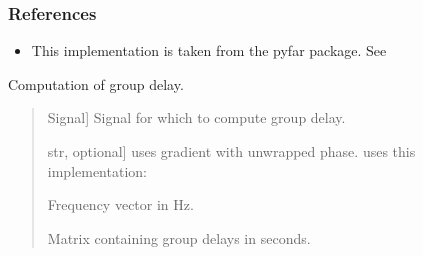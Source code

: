 \documentclass[letterpaper,10pt,english]{sphinxmanual}
\begin{document}
\begin{fulllineitems}
\begin{quote}
\begin{description}
\begin{description}
\end{description}

\end{description}\end{quote}
\subsubsection*{References}
\begin{itemize}
\item {} 
\sphinxAtStartPar
This implementation is taken from the pyfar package. See

\end{itemize}

\end{fulllineitems}


\begin{fulllineitems}
\label{\detokenize{modules/dsptoolbox.standard_functions:dsptoolbox.standard_functions.group_delay}}
\pysigstartsignatures
{}
\pysigstopsignatures
\sphinxAtStartPar
Computation of group delay.
\begin{quote}\begin{description}
\begin{description}
\sphinxlineitem{\sphinxstylestrong{signal}}{[}Signal{]}
\sphinxAtStartPar
Signal for which to compute group delay.

\sphinxlineitem{\sphinxstylestrong{method}}{[}str, optional{]}
\sphinxAtStartPar
{} uses gradient with unwrapped phase.  uses
this implementation:

\end{description}

\begin{description}
\sphinxlineitem{\sphinxstylestrong{freqs}}{[}\sphinxtitleref{np.ndarray}{]}
\sphinxAtStartPar
Frequency vector in Hz.

\sphinxlineitem{\sphinxstylestrong{group\_delays}}{[}\sphinxtitleref{np.ndarray}{]}
\sphinxAtStartPar
Matrix containing group delays in seconds.

\end{description}

\end{description}\end{quote}

\end{fulllineitems}
\end{document}
